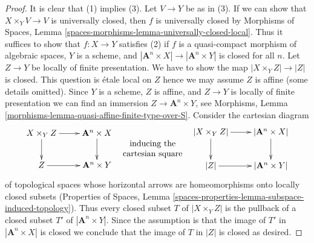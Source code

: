 \documentclass{stacks-project}
\theoremstyle{plain}
\theoremstyle{definition}
\theoremstyle{remark}
\numberwithin{equation}{subsection}
\begin{document}
\begin{proof}
\medskip\noindent
It is clear that (1) implies (3). Let $V \to Y$ be as in (3).
If we can show that $X \times_Y V \to V$ is universally closed,
then $f$ is universally closed by
Morphisms of Spaces, Lemma
\ref{spaces-morphisms-lemma-universally-closed-local}.
Thus it suffices to show that $f : X \to Y$ satisfies (2)
if $f$ is a quasi-compact morphism of algebraic spaces,
$Y$ is a scheme, and $|\mathbf{A}^n \times X| \to |\mathbf{A}^n \times Y|$
is closed for all $n$. Let $Z \to Y$ be locally of finite presentation.
We have to show the map $|X \times_Y Z| \to |Z|$ is closed.
This question is \'etale local on $Z$ hence we may assume $Z$
is affine (some details omitted). Since $Y$ is a scheme, $Z$ is affine,
and $Z \to Y$ is locally of finite presentation we can find
an immersion $Z \to \mathbf{A}^n \times Y$, see
Morphisms, Lemma \ref{morphisms-lemma-quasi-affine-finite-type-over-S}.
Consider the cartesian diagram
$$
\vcenter{
\xymatrix{
X \times_Y Z \ar[d] \ar[r] & \mathbf{A}^n \times X \ar[d] \\
Z \ar[r] & \mathbf{A}^n \times Y
}
}
\quad
\begin{matrix}
\text{inducing the} \\
\text{cartesian square}
\end{matrix}
\quad
\vcenter{
\xymatrix{
|X \times_Y Z| \ar[d] \ar[r] & |\mathbf{A}^n \times X| \ar[d] \\
|Z| \ar[r] & |\mathbf{A}^n \times Y|
}
}
$$
of topological spaces whose horizontal arrows are homeomorphisms
onto locally closed subsets (Properties of Spaces, Lemma
\ref{spaces-properties-lemma-subspace-induced-topology}).
Thus every closed subset $T$
of $|X \times_Y Z|$ is the pullback of a closed subset $T'$ of
$|\mathbf{A}^n \times Y|$. Since the assumption is that the image
of $T'$ in $|\mathbf{A}^n \times X|$ is closed we conclude that
the image of $T$ in $|Z|$ is closed as desired.
\end{proof}
\end{document}
